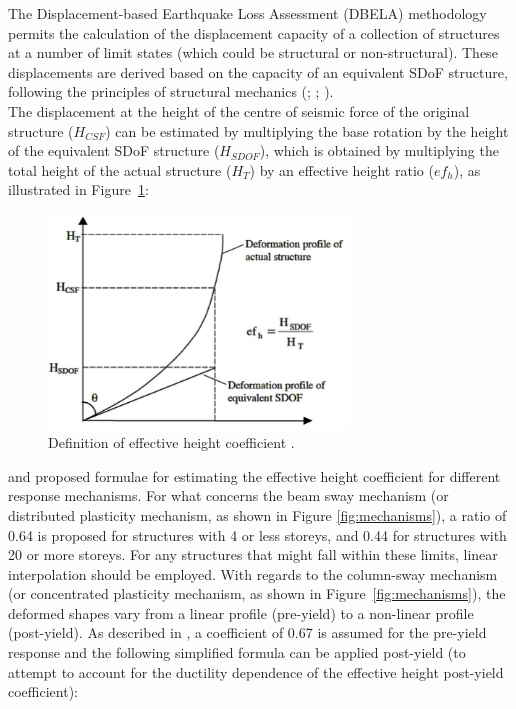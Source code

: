 The Displacement-based Earthquake Loss Assessment (DBELA) methodology permits the calculation of the displacement capacity of a collection of structures at a number of limit states (which could be structural or non-structural). These displacements are derived based on the capacity of an equivalent SDoF structure, following the principles of structural mechanics (\cite{CrowleyEtAl2004}; \cite{BalEtAl2010}; \cite{SilvaEtAl2013}).\\
The displacement at the height of the centre of seismic force of the original structure ($H_{CSF}$) can be estimated by multiplying the base rotation by the height of the equivalent SDoF structure ($H_{SDOF}$), which is obtained by multiplying the total height of the actual structure ($H_T$) by an effective height ratio ($ef_h$), as illustrated in Figure~\ref{fig:efh}:

\begin{figure}[htb]
  \centering
      \includegraphics[width=8cm]{figures/effective_height.png}
  \caption{Definition of effective height coefficient \cite{GlaisterPinho2003}.}
  \label{fig:efh}
\end{figure}

\cite{PinhoEtAl2002} and \cite{GlaisterPinho2003} proposed formulae for estimating the effective height coefficient for different response mechanisms. For what concerns the beam sway mechanism (or distributed plasticity mechanism, as shown in Figure \ref{fig:mechanisms}), a ratio of 0.64 is proposed for structures with 4 or less storeys, and 0.44 for structures with 20 or more storeys. For any structures that might fall within these limits, linear interpolation should be employed. With regards to the column-sway mechanism (or concentrated plasticity mechanism, as shown in Figure~\ref{fig:mechanisms}), the deformed shapes vary from a linear profile (pre-yield) to a non-linear profile (post-yield). As described in \cite{GlaisterPinho2003}, a coefficient of 0.67 is assumed for the pre-yield response and the following simplified formula can be applied post-yield (to attempt to account for the ductility dependence of the effective height post-yield coefficient):

